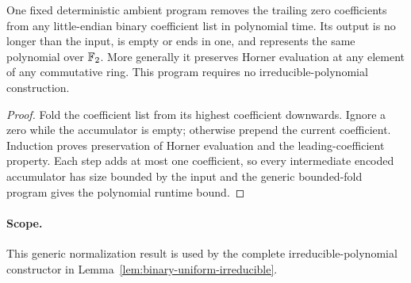 \begin{lemma}
\label{lem:binary-polynomial-normalization}
\leanok
One fixed deterministic ambient program removes the trailing zero coefficients
from any little-endian binary coefficient list in polynomial time. Its output
is no longer than the input, is empty or ends in one, and represents the same
polynomial over $\mathbb{F}_2$. More generally it preserves Horner evaluation at any
element of any commutative ring. This program requires no irreducible-polynomial
construction.
\end{lemma}
\begin{proof}
\leanok
Fold the coefficient list from its highest coefficient downwards. Ignore a zero
while the accumulator is empty; otherwise prepend the current coefficient.
Induction proves preservation of Horner evaluation and the leading-coefficient
property. Each step adds at most one coefficient, so every intermediate encoded
accumulator has size bounded by the input and the generic bounded-fold program
gives the polynomial runtime bound.
\end{proof}
\paragraph{Scope.} This generic normalization result is used by the complete
irreducible-polynomial constructor in Lemma~\ref{lem:binary-uniform-irreducible}.


